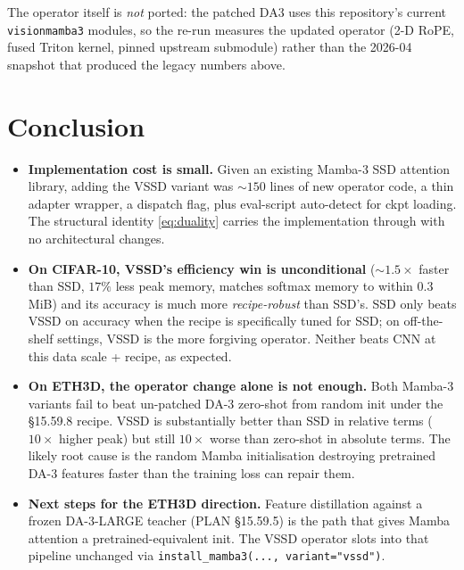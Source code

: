 \documentclass[11pt,a4paper]{article}
\begin{document}
The operator itself is \emph{not} ported: the patched DA3 uses this
repository's current \texttt{visionmamba3} modules, so the re-run measures the
updated operator (2-D RoPE, fused Triton kernel, pinned upstream submodule)
rather than the 2026-04 snapshot that produced the legacy numbers above.

\section{Conclusion}

\begin{itemize}
  \item \textbf{Implementation cost is small.} Given an existing
        Mamba-3 SSD attention library, adding the VSSD variant was
        $\sim 150$ lines of new operator code, a thin adapter wrapper,
        a dispatch flag, plus eval-script auto-detect for ckpt
        loading. The structural identity \eqref{eq:duality} carries
        the implementation through with no architectural changes.
  \item \textbf{On CIFAR-10, VSSD's efficiency win is unconditional}
        ($\sim 1.5\times$ faster than SSD, $17\%$ less peak memory,
        matches softmax memory to within $0.3$ MiB) and its accuracy
        is much more \emph{recipe-robust} than SSD's. SSD only
        beats VSSD on accuracy when the recipe is specifically tuned
        for SSD; on off-the-shelf settings, VSSD is the more
        forgiving operator. Neither beats CNN at this data scale +
        recipe, as expected.
  \item \textbf{On ETH3D, the operator change alone is not enough.}
        Both Mamba-3 variants fail to beat un-patched DA-3 zero-shot
        from random init under the \S15.59.8 recipe. VSSD is
        substantially better than SSD in relative terms ($10\times$
        higher peak) but still $10\times$ worse than zero-shot in
        absolute terms. The likely root cause is the random Mamba
        initialisation destroying pretrained DA-3 features faster
        than the training loss can repair them.
  \item \textbf{Next steps for the ETH3D direction.} Feature
        distillation against a frozen DA-3-LARGE teacher
        (PLAN \S15.59.5) is the path that gives Mamba attention a
        pretrained-equivalent init. The VSSD operator slots into
        that pipeline unchanged via
        \texttt{install\_mamba3(..., variant="vssd")}.
\end{itemize}
\end{document}
